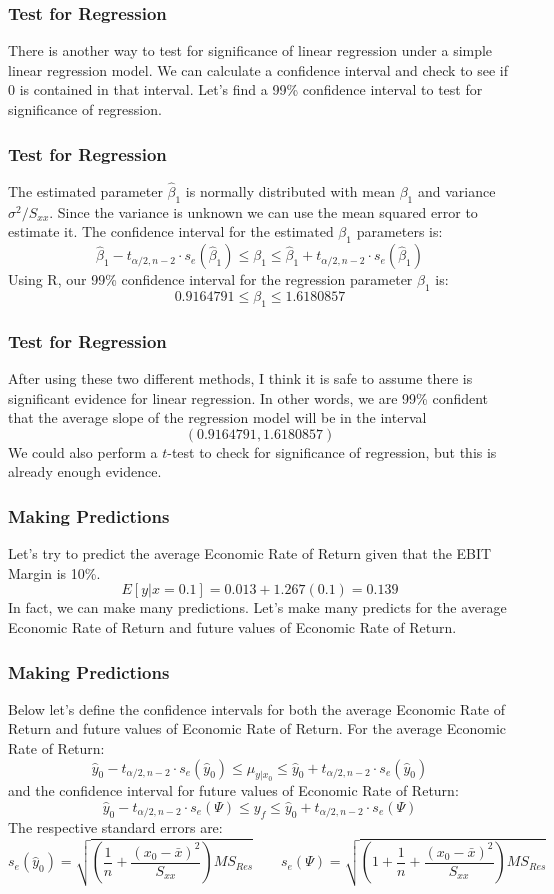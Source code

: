 \documentclass[12pt]{beamer}
\begin{document}
\begin{frame}
\frametitle{Test for Regression}
There is another way to test for significance of linear regression under a simple linear regression model. We can calculate a confidence interval and check to see if 0 is contained in that interval. Let's find a 99\% confidence interval to test for significance of regression.
\end{frame}

\begin{frame}
\frametitle{Test for Regression}
The estimated parameter $\hat{\beta}_1$ is normally distributed with mean $\beta_1$ and variance $\sigma^2/S_{xx}$. Since the variance is unknown we can use the mean squared error to estimate it. The confidence interval for the estimated $\beta_1$ parameters is: $$\hat{\beta}_1-t_{\alpha/2,n-2}\cdot s_e\left(\hat{\beta}_1\right)\leq \beta_1\leq \hat{\beta}_1+t_{\alpha/2,n-2}\cdot s_e\left(\hat{\beta}_1\right)$$ Using R, our 99\% confidence interval for the regression parameter $\beta_1$ is: $$0.9164791\leq \beta_1\leq 1.6180857$$
\end{frame}

\begin{frame}
\frametitle{Test for Regression}
After using these two different methods, I think it is safe to assume there is significant evidence for linear regression. In other words, we are 99\% confident that the average slope of the regression model will be in the interval $$(0.9164791,1.6180857)$$ We could also perform a $t$-test to check for significance of regression, but this is already enough evidence.
\end{frame}

\begin{frame}
\frametitle{Making Predictions}
Let's try to predict the average Economic Rate of Return given that the EBIT Margin is 10\%. $$E[y|x=0.1]=0.013+1.267(0.1)=0.139$$ In fact, we can make many predictions. Let's make many predicts for the average Economic Rate of Return and future values of Economic Rate of Return.
\end{frame}

\begin{frame}
\frametitle{Making Predictions}
Below let's define the confidence intervals for both the average Economic Rate of Return and future values of Economic Rate of Return. For the average Economic Rate of Return: $$\hat{y}_0-t_{\alpha/2,n-2}\cdot s_e\left(\hat{y}_0\right)\leq \mu_{y|x_0}\leq \hat{y}_0+t_{\alpha/2,n-2}\cdot s_e\left(\hat{y}_0\right)$$ and the confidence interval for future values of Economic Rate of Return: $$\hat{y}_0-t_{\alpha/2,n-2}\cdot s_e\left(\Psi\right)\leq y_f\leq \hat{y}_0+t_{\alpha/2,n-2}\cdot s_e\left(\Psi\right)$$ The respective standard errors are: {\scriptsize $$s_e\left(\hat{y}_0\right)=\sqrt{\left(\frac{1}{n}+\frac{\left(x_0-\bar{x}\right)^2}{S_{xx}}\right)MS_{Res}}\qquad s_e\left(\Psi\right)=\sqrt{\left(1+\frac{1}{n}+\frac{\left(x_0-\bar{x}\right)^2}{S_{xx}}\right)MS_{Res}}$$}
\end{frame}
\end{document}
